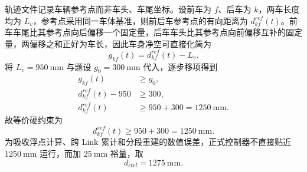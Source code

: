 \documentclass[UTF8]{ctexart}
\begin{document}
轨迹文件记录车辆参考点而非车头、车尾坐标。设前车为 $f$、后车为 $k$，两车长度均为 $L_v$，参考点采用同一车体基准，则前后车参考点的有向距离为 $d_{kf}^{ref}(t)$。前车车尾比其参考点向后偏移一个固定量，后车车头比其参考点向前偏移互补的固定量，两偏移之和正好为车长，因此车身净空可直接化简为
\begin{equation}
g_{kf}(t)=d_{kf}^{ref}(t)-L_v.
\end{equation}
将 $L_v=950\ \mathrm{mm}$ 与题设 $g_0=300\ \mathrm{mm}$ 代入，逐步移项得到
\begin{align}
g_{kf}(t)&\ge g_0,\\
d_{kf}^{ref}(t)-950&\ge300,\\
d_{kf}^{ref}(t)&\ge950+300=1250\ \mathrm{mm}.
\end{align}
故等价硬约束为
\begin{equation}\label{eq:reference-gap}
d_{kf}^{ref}(t)\ge950+300=1250\ \mathrm{mm}.
\end{equation}
为吸收浮点计算、跨 Link 累计和分段重建的数值误差，正式控制器不直接贴近 $1250\ \mathrm{mm}$ 运行，而加 $25\ \mathrm{mm}$ 裕量，取
\begin{equation}\label{eq:control-gap}
d_{ctrl}=1275\ \mathrm{mm}.
\end{equation}
\end{document}
